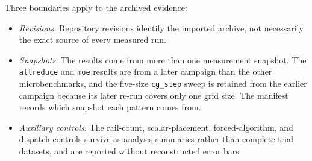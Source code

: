 Three boundaries apply to the archived evidence:
\begin{itemize}
    \item \emph{Revisions.} Repository revisions identify the imported archive, not necessarily the exact source of every measured run.
    \item \emph{Snapshots.} The results come from more than one measurement snapshot. The \texttt{allreduce} and \texttt{moe} results are from a later campaign than the other microbenchmarks, and the five-size \texttt{cg\_step} sweep is retained from the earlier campaign because its later re-run covers only one grid size. The manifest records which snapshot each pattern comes from.
    \item \emph{Auxiliary controls.} The rail-count, scalar-placement, forced-algorithm, and dispatch controls survive as analysis summaries rather than complete trial datasets, and are reported without reconstructed error bars.
\end{itemize}
